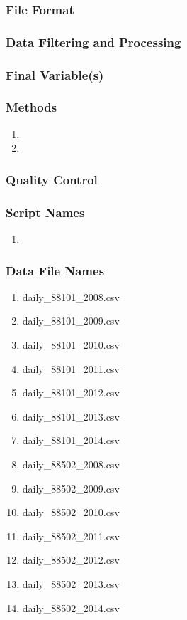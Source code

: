 \subsubsection*{File Format}

\subsubsection*{Data Filtering and Processing}

\subsubsection*{Final Variable(s)}

\subsubsection*{Methods}

\begin{enumerate}
\item 
\item
\end{enumerate}

\subsubsection*{Quality Control}

\subsubsection*{Script Names}

\begin{enumerate}
\item 
\end{enumerate}

\subsubsection*{Data File Names}

\begin{enumerate}
\item daily\_88101\_2008.csv
\item daily\_88101\_2009.csv
\item daily\_88101\_2010.csv
\item daily\_88101\_2011.csv
\item daily\_88101\_2012.csv
\item daily\_88101\_2013.csv
\item daily\_88101\_2014.csv
\item daily\_88502\_2008.csv
\item daily\_88502\_2009.csv
\item daily\_88502\_2010.csv
\item daily\_88502\_2011.csv
\item daily\_88502\_2012.csv
\item daily\_88502\_2013.csv
\item daily\_88502\_2014.csv
\end{enumerate} 

